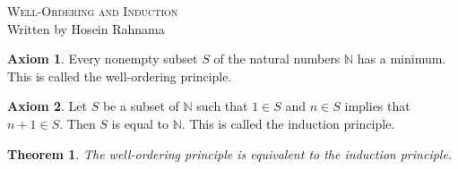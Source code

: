 \documentclass[10pt]{article}
\newtheorem{thm}{Theorem}
\theoremstyle{definition}
\newtheorem{axm}{Axiom}
\theoremstyle{remark}
\begin{document}
\begin{center}
{\Large \scshape Well-Ordering and Induction} \\
Written by Hosein Rahnama
\end{center}

\begin{axm}
Every nonempty subset $S$ of the natural numbers $\mathbb{N}$ has a minimum. This is called the well-ordering principle.
\end{axm}

\begin{axm}
Let $S$ be a subset of $\mathbb{N}$ such that $1 \in S$ and $n \in S$ implies that $n + 1 \in S$. Then $S$ is equal to $\mathbb{N}$. This is called the induction principle.
\end{axm}

\begin{thm}
The well-ordering principle is equivalent to the induction principle.
\end{thm}
\end{document}
